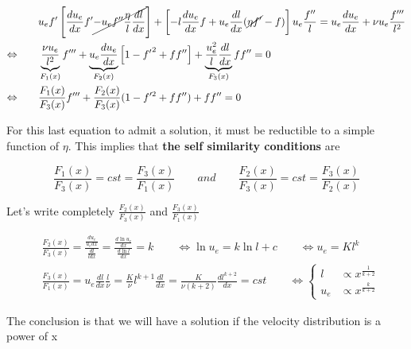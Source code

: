 			\begin{equation}
			\begin{aligned}
				&u_ef' \left[ \frac{du_e}{dx}f' \cancel{- u_e f''\frac{\eta}{l}\frac{dl}{dx}} \right] + \left[-l \frac{du_e}{dx} f + u_e \frac{dl}{dx} (\cancel{\eta f'} - f)\right] u_e \frac{f''}{l} = u_e\frac{du_e}{dx} + \nu u_e \frac{f'''}{l^2}\\
				\Leftrightarrow \qquad &\underbrace{\frac{\nu u_e }{l^2}}_{F_1(x)}f''' + \underbrace{u_e \frac{du_e}{dx}}_{F_2(x)} \left[1 - {f'}^2 + ff'' \right] + \underbrace{ \frac{u_e^2}{l}\frac{dl}{dx}}_{F_3(x)}ff'' = 0 \\
				\Leftrightarrow \qquad &\frac{F_1(x)}{F_3(x)}f''' + \frac{F_2(x)}{F_3(x)}(1-f'^2+ff'') + ff''=0 
			\end{aligned}
			\label{eq:5.49}
			\end{equation}
			
			For this last equation to admit a solution, it must be reductible to a simple function of $\eta$. This implies that \textbf{the self similarity conditions} are
			
			\begin{equation}
				\frac{F_1(x)}{F_3(x)} = cst  =\frac{F_3(x)}{F_1(x)} \qquad and \qquad \frac{F_2(x)}{F_3(x)} = cst = \frac{F_3(x)}{F_2(x)}
			\end{equation}
			
			Let's write completely $\frac{F_2(x)}{F_3(x)}$ and $\frac{F_3(x)}{F_1(x)}$
			
			\begin{equation}
			\begin{aligned}
				&\frac{F_2(x)}{F_3(x)} =  \frac{\frac{du_e}{u_e dx}}{\frac{dl}{ldx}} = \frac{\frac{d\ln u_e}{dx}}{\frac{d \ln l}{dx}} = k \qquad \Leftrightarrow \ln u_e =k \ln l + c \qquad \Leftrightarrow u_e = K l ^k\\
				&\frac{F_3(x)}{F_1(x)} = u_e\frac{dl}{dx} \frac{l}{\nu } = \frac{K}{\nu}l^{k+1}\frac{dl}{dx} = \frac{K}{\nu (k+2)} \frac{dl^{k+2}}{dx} = cst \qquad \Leftrightarrow \left\{\begin{aligned} l &\propto x^{\frac{1}{k+2}}\\
				u_e &\propto x^{\frac{k}{k+2}} \end{aligned}\right.
			\end{aligned}
			\end{equation}
			
			The conclusion is that we will have a solution if the velocity distribution is a power of x 
			
